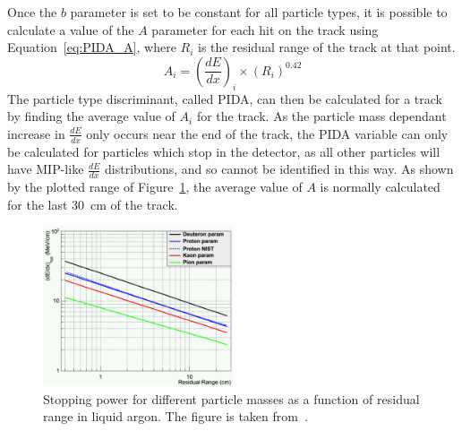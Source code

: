 Once the $b$ parameter is set to be constant for all particle types, it is possible to calculate a value of the $A$ parameter for each hit on the track using Equation~\ref{eq:PIDA_A}, where $R_i$ is the residual range of the track at that point.
\begin{equation}
  \label{eq:PIDA_A}
  A_i = \left(\frac{dE}{dx}\right)_i \times \left(R_{i}\right)^{0.42}
\end{equation}
The particle type discriminant, called PIDA, can then be calculated for a track by finding the average value of $A_i$ for the track. As the particle mass dependant increase in $\frac{dE}{dx}$ only occurs near the end of the track, the PIDA variable can only be calculated for particles which stop in the detector, as all other particles will have MIP-like $\frac{dE}{dx}$ distributions, and so cannot be identified in this way. As shown by the plotted range of Figure~\ref{fig:PIDA_loglog}, the average value of $A$ is normally calculated for the last 30~cm of the track. \\

\begin{figure}
  \centering
  \includegraphics[width=0.5\textwidth]{StoppingPower}
  \caption[Stopping power for different particle masses as a function of residual range in liquid argon]
          {Stopping power for different particle masses as a function of residual range in liquid argon. The figure is taken from~\citep{PIDA_Paper}.}
  \label{fig:PIDA_loglog}
\end{figure}

